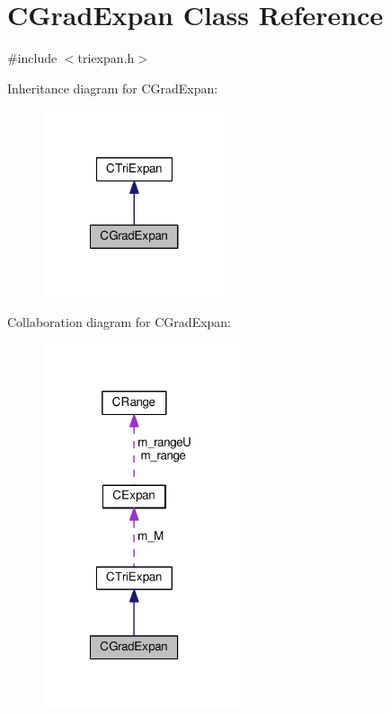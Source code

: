 \hypertarget{classCGradExpan}{\section{C\-Grad\-Expan Class Reference}
\label{classCGradExpan}
}


{\ttfamily \#include $<$triexpan.\-h$>$}



Inheritance diagram for C\-Grad\-Expan\-:\nopagebreak
\begin{figure}[H]
\begin{center}
\leavevmode
\includegraphics[width=152pt]{classCGradExpan__inherit__graph}
\end{center}
\end{figure}


Collaboration diagram for C\-Grad\-Expan\-:\nopagebreak
\begin{figure}[H]
\begin{center}
\leavevmode
\includegraphics[width=165pt]{classCGradExpan__coll__graph}
\end{center}
\end{figure}
